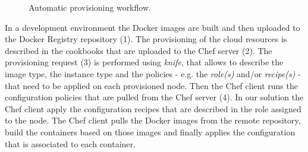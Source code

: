 \begin{figure}[ht!]
  \centering
  \caption[Automatic provisioning workflow.]{Automatic provisioning workflow.}
  \label{fig:provisioning_tech_architecture}
\end{figure}

In a development environment the Docker images are built and then uploaded to the Docker Registry
repository (1). The provisioning of the cloud resources is described in the cookbooks that are uploaded
to the Chef server (2). The provisioning request (3) is performed using \textit{knife}, that allows to
describe the image type, the instance type and the policies - e.g. the \textit{role(s)} and/or \textit{recipe(s)} -
that need to be applied on each provisioned node. Then the Chef client runs the configuration policies
that are pulled from the Chef server (4). In our solution the Chef client apply the configuration recipes
that are described in the role assigned to the node. The Chef client pulls the Docker images from the
remote repository, build the containers based on those images and finally applies the configuration
that is associated to each container.\\

